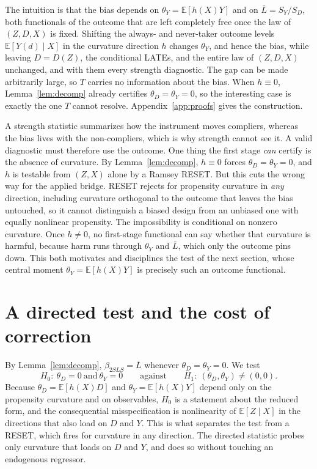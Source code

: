 \documentclass[11pt]{article}
\theoremstyle{plain}
\theoremstyle{definition}
\newcommand{\E}{\mathbb{E}}
\newcommand{\Lb}{\bar{L}}
\begin{document}
\noindent The intuition is that the bias depends on $\theta_Y=\E[h(X)Y]$ and on $\Lb=S_Y/S_D$, both functionals of the outcome that are left completely free once the law of $(Z,D,X)$ is fixed. Shifting the always- and never-taker outcome levels $\E[Y(d)\mid X]$ in the curvature direction $h$ changes $\theta_Y$, and hence the bias, while leaving $D=D(Z)$, the conditional LATEs, and the entire law of $(Z,D,X)$ unchanged, and with them every strength diagnostic. The gap can be made arbitrarily large, so $T$ carries no information about the bias. When $h\equiv 0$, Lemma~\ref{lem:decomp} already certifies $\theta_D=\theta_Y=0$, so the interesting case is exactly the one $T$ cannot resolve. Appendix~\ref{app:proofs} gives the construction.

A strength statistic summarizes how the instrument moves compliers, whereas the bias lives with the non-compliers, which is why strength cannot see it. A valid diagnostic must therefore use the outcome. One thing the first stage \emph{can} certify is the absence of curvature. By Lemma~\ref{lem:decomp}, $h\equiv 0$ forces $\theta_D=\theta_Y=0$, and $h$ is testable from $(Z,X)$ alone by a Ramsey RESET. But this cuts the wrong way for the applied bridge. RESET rejects for propensity curvature in \emph{any} direction, including curvature orthogonal to the outcome that leaves the bias untouched, so it cannot distinguish a biased design from an unbiased one with equally nonlinear propensity. The impossibility is conditional on nonzero curvature. Once $h\neq 0$, no first-stage functional can say whether that curvature is harmful, because harm runs through $\theta_Y$ and $\Lb$, which only the outcome pins down. This both motivates and disciplines the test of the next section, whose central moment $\theta_Y=\E[h(X)Y]$ is precisely such an outcome functional.

\section{A directed test and the cost of correction}\label{sec:test}

By Lemma~\ref{lem:decomp}, $\beta_{2SLS}=\Lb$ whenever $\theta_D=\theta_Y=0$. We test
\begin{equation}\label{eq:H0}
H_0:\ \theta_D=0\ \text{and}\ \theta_Y=0\qquad\text{against}\qquad H_1:\ (\theta_D,\theta_Y)\neq(0,0).
\end{equation}
Because $\theta_D=\E[h(X)D]$ and $\theta_Y=\E[h(X)Y]$ depend only on the propensity curvature and on observables, $H_0$ is a statement about the reduced form, and the consequential misspecification is nonlinearity of $\E[Z\mid X]$ in the directions that also load on $D$ and $Y$. This is what separates the test from a RESET, which fires for curvature in any direction. The directed statistic probes only curvature that loads on $D$ and $Y$, and does so without touching an endogenous regressor.
\end{document}
